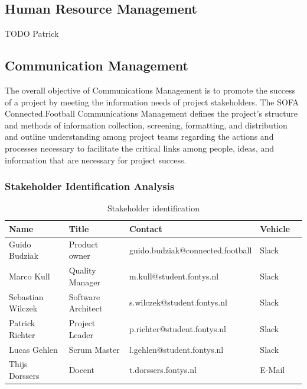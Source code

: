 
\subsection{Human Resource Management}
\label{ssec:human_resource_management}

TODO Patrick



\subsection{Communication Management}
\label{ssec:communication_management}

The overall objective of  Communications Management is to promote the success of a project by meeting the information needs of project stakeholders. The SOFA Connected.Football Communications Management defines the project’s structure and methods of information collection, screening, formatting, and distribution and outline understanding among project teams regarding the actions and processes necessary to facilitate the critical links among people, ideas, and information that are necessary for project success.
 
\subsubsection{Stakeholder Identification Analysis}
\label{sssec:stakeholder_identification_analysis}

\begin{table}[H]
    \centering
    \begin{tabular}{|l|l|l|l|l|}
        \hline
        \cellcolor{gray}Name & \cellcolor{gray}Title & \cellcolor{gray}Contact & \cellcolor{gray}Vehicle \\ \hline
        Guido Budziak & Product owner & guido.budziak@connected.football & Slack  \\ \hline
        Marco Kull & Quality Manager & m.kull@student.fontys.nl & Slack    \\ \hline
        Sebastian Wilczek & Software Architect & s.wilczek@student.fontys.nl & Slack   \\ \hline
        Patrick Richter & Project Leader & p.richter@student.fontys.nl & Slack \\ \hline
        Lucas Gehlen & Scrum Master & l.gehlen@student.fontys.nl & Slack   \\ \hline
        Thijs Dorssers & Docent & t.dorssers.fontys.nl & E-Mail   \\ \hline
    \end{tabular}
    \caption{Stakeholder identification}
    \label{tab:stakeholder_identification}
\end{table}


